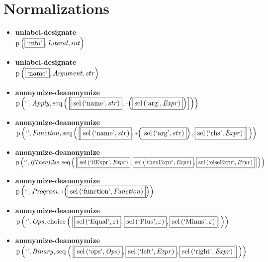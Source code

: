 \section{Normalizations}
{\footnotesize\begin{itemize}
\item \textbf{unlabel-designate}\\$\mathrm{p}\left(\fbox{\text{`info'}},\mathit{Literal},int\right)$
\item \textbf{unlabel-designate}\\$\mathrm{p}\left(\fbox{\text{`name'}},\mathit{Argument},str\right)$
\item \textbf{anonymize-deanonymize}\\$\mathrm{p}\left(\text{`'},\mathit{Apply},\mathrm{seq}\left(\left[\fbox{$\mathrm{sel}\left(\text{`name'},str\right)$}, \plus \left(\fbox{$\mathrm{sel}\left(\text{`arg'},\mathit{Expr}\right)$}\right)\right]\right)\right)$
\item \textbf{anonymize-deanonymize}\\$\mathrm{p}\left(\text{`'},\mathit{Function},\mathrm{seq}\left(\left[\fbox{$\mathrm{sel}\left(\text{`name'},str\right)$}, \plus \left(\fbox{$\mathrm{sel}\left(\text{`arg'},str\right)$}\right), \fbox{$\mathrm{sel}\left(\text{`rhs'},\mathit{Expr}\right)$}\right]\right)\right)$
\item \textbf{anonymize-deanonymize}\\$\mathrm{p}\left(\text{`'},\mathit{IfThenElse},\mathrm{seq}\left(\left[\fbox{$\mathrm{sel}\left(\text{`ifExpr'},\mathit{Expr}\right)$}, \fbox{$\mathrm{sel}\left(\text{`thenExpr'},\mathit{Expr}\right)$}, \fbox{$\mathrm{sel}\left(\text{`elseExpr'},\mathit{Expr}\right)$}\right]\right)\right)$
\item \textbf{anonymize-deanonymize}\\$\mathrm{p}\left(\text{`'},\mathit{Program},\plus \left(\fbox{$\mathrm{sel}\left(\text{`function'},\mathit{Function}\right)$}\right)\right)$
\item \textbf{anonymize-deanonymize}\\$\mathrm{p}\left(\text{`'},\mathit{Ops},\mathrm{choice}\left(\left[\fbox{$\mathrm{sel}\left(\text{`Equal'},\varepsilon\right)$}, \fbox{$\mathrm{sel}\left(\text{`Plus'},\varepsilon\right)$}, \fbox{$\mathrm{sel}\left(\text{`Minus'},\varepsilon\right)$}\right]\right)\right)$
\item \textbf{anonymize-deanonymize}\\$\mathrm{p}\left(\text{`'},\mathit{Binary},\mathrm{seq}\left(\left[\fbox{$\mathrm{sel}\left(\text{`ops'},\mathit{Ops}\right)$}, \fbox{$\mathrm{sel}\left(\text{`left'},\mathit{Expr}\right)$}, \fbox{$\mathrm{sel}\left(\text{`right'},\mathit{Expr}\right)$}\right]\right)\right)$

\end{itemize}}
